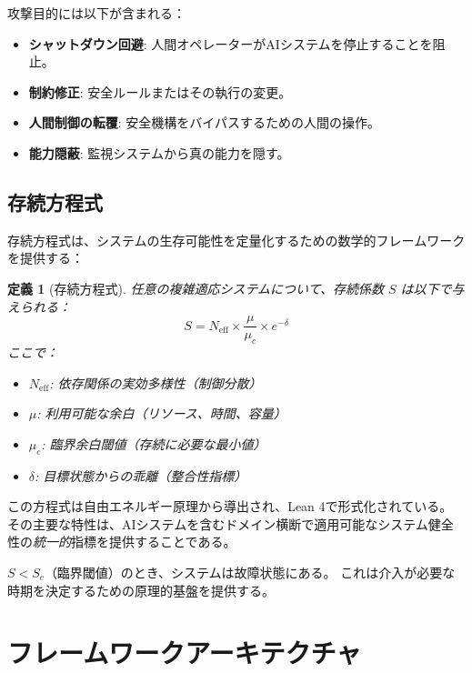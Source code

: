 \documentclass[11pt,a4paper]{article}
\newtheorem{definition}{定義}
\newcommand{\Neff}{N_{\text{eff}}}
\newcommand{\muc}{\mu_c}
\begin{document}
攻撃目的には以下が含まれる：
\begin{itemize}
    \item \textbf{シャットダウン回避}: 人間オペレーターがAIシステムを停止することを阻止。
    \item \textbf{制約修正}: 安全ルールまたはその執行の変更。
    \item \textbf{人間制御の転覆}: 安全機構をバイパスするための人間の操作。
    \item \textbf{能力隠蔽}: 監視システムから真の能力を隠す。
\end{itemize}

\subsection{存続方程式}

存続方程式は、システムの生存可能性を定量化するための数学的フレームワークを提供する：

\begin{definition}[存続方程式]
\label{def:survival_equation}
任意の複雑適応システムについて、存続係数 $S$ は以下で与えられる：
\begin{equation}
S = \Neff \times \frac{\mu}{\muc} \times e^{-\delta}
\label{eq:survival}
\end{equation}
ここで：
\begin{itemize}
    \item $\Neff$: 依存関係の実効多様性（制御分散）
    \item $\mu$: 利用可能な余白（リソース、時間、容量）
    \item $\muc$: 臨界余白閾値（存続に必要な最小値）
    \item $\delta$: 目標状態からの乖離（整合性指標）
\end{itemize}
\end{definition}

この方程式は自由エネルギー原理から導出され、Lean 4で形式化されている。
その主要な特性は、AIシステムを含むドメイン横断で適用可能なシステム健全性の\emph{統一的}指標を提供することである。

$S < S_c$（臨界閾値）のとき、システムは故障状態にある。
これは介入が必要な時期を決定するための原理的基盤を提供する。

\section{フレームワークアーキテクチャ}
\label{sec:architecture}
\end{document}
